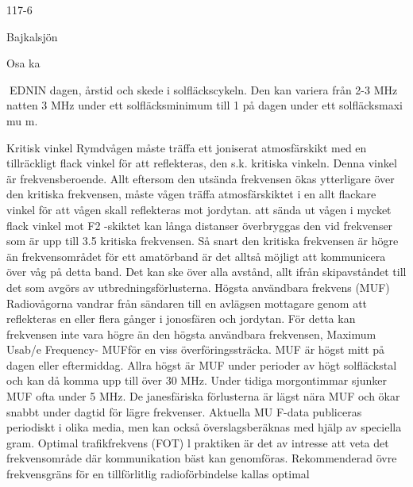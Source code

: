 117-6

Bajkalsjön

Osa ka

EDNIN
dagen, årstid och skede i solfläckscykeln.
Den kan variera från 2-3 MHz
natten
3 MHz
under ett solfläcksminimum till 1
på dagen under ett solfläcksmaxi mu m.

Kritisk vinkel
Rymdvågen måste träffa ett joniserat atmosfärskikt med en tillräckligt flack vinkel för att
reflekteras, den s.k. kritiska vinkeln. Denna
vinkel är frekvensberoende. Allt eftersom
den utsända frekvensen ökas ytterligare över
den kritiska frekvensen, måste vågen träffa
atmosfärskiktet i en allt flackare vinkel för att
vågen skall reflekteras mot jordytan.
att sända ut vågen i mycket flack vinkel mot
F2 -skiktet kan långa distanser överbryggas
den
vid frekvenser som är upp till 3.5
kritiska frekvensen.
Så snart den kritiska frekvensen är högre
än frekvensområdet för ett amatörband är
det alltså möjligt att kommunicera över
våg på detta band. Det kan ske över alla
avstånd, allt ifrån skipavståndet till det som
avgörs av utbredningsförlusterna.
Högsta användbara frekvens (MUF)
Radiovågorna vandrar från sändaren till en
avlägsen mottagare genom att reflekteras
en eller flera gånger i jonosfären och jordytan. För detta kan frekvensen inte vara
högre än den högsta användbara frekvensen, Maximum Usab/e Frequency- MUFför en viss överföringssträcka.
MUF är högst mitt på dagen eller
eftermiddag. Allra högst är MUF under perioder av högt solfläckstal och kan då komma
upp till över 30 MHz. Under tidiga morgontimmar sjunker MUF ofta under 5 MHz.
De janesfäriska förlusterna är lägst nära
MUF och ökar snabbt under dagtid för lägre
frekvenser.
Aktuella MU F-data publiceras periodiskt
i olika media, men kan också överslagsberäknas med hjälp av speciella
gram.
Optimal trafikfrekvens (FOT)
l praktiken är det av intresse att veta det
frekvensområde där kommunikation bäst kan
genomföras.
Rekommenderad övre frekvensgräns för
en tillförlitlig radioförbindelse kallas optimal

